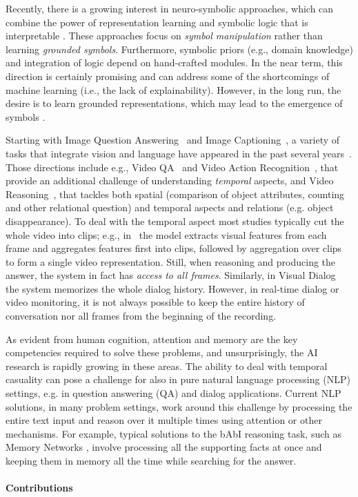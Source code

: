 Recently, there is a growing interest in neuro-symbolic approaches, which can combine the power of representation learning and symbolic logic that is interpretable \cite{mao2019neurosymbolic}. These approaches focus on \textit{symbol manipulation} rather than learning \textit{grounded symbols}.  Furthermore, symbolic priors (e.g., domain knowledge) and integration of logic depend on hand-crafted modules.  In the near term, this direction is certainly promising and can address some of the shortcomings of machine learning (i.e., the lack of explainability)\cite{vedantam2019probabilistic}.  However, in the long run, the desire is to learn grounded representations, which may lead to the emergence of symbols \cite{taniguchi2018symbol}.

Starting with Image Question Answering~\cite{malinowski2014multi,antol2015} and Image Captioning~\cite{karpathy2015deep}, a variety of tasks that integrate vision and language have appeared in the past several years~\cite{mogadala2019trends}. 
Those directions include e.g., Video QA~\cite{MovieQA} and Video Action Recognition~\cite{monfort2019moments}, that provide an additional challenge of understanding \emph{temporal} aspects, and Video Reasoning~\cite{song2018explore,yang2018dataset}, that tackles both spatial (comparison of object attributes, counting and other relational question) and temporal aspects and relations (e.g. object disappearance).
To deal with the temporal aspect most studies typically cut the whole video into clips; e.g., in~\cite{song2018explore} the model extracts visual features from each frame and aggregates features first into clips, followed by aggregation over clips to form a single video representation.
Still, when reasoning and producing the answer, the system in fact has \textit{access to all frames}. 
Similarly, in Visual Dialog~\cite{das2017visual} the system memorizes the whole dialog history.
However, in real-time dialog or video monitoring, it is not always possible to keep the entire history of conversation nor all frames from the beginning of the recording.  


As evident from human cognition, attention and memory are the key competencies required to solve these problems, and unsurprisingly, the AI research is rapidly growing in these areas.
The ability to deal with temporal casuality can pose a challenge for also in pure natural language processing (NLP) settings, e.g. in question answering (QA) and dialog applications.  
Current NLP solutions, in many problem settings, work around this challenge by processing the entire text input and reason over it multiple times using attention \cite{vaswani2017attention} or other mechanisms.
For example, typical solutions to the bAbI reasoning task, such as Memory Networks \cite{weston2014memory}, involve processing all the supporting facts at once and keeping them in memory all the time while searching for the answer.


\paragraph{Contributions}
